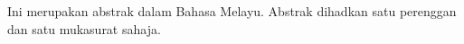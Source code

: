 Ini merupakan abstrak dalam Bahasa Melayu. Abstrak dihadkan satu perenggan dan satu mukasurat sahaja.
